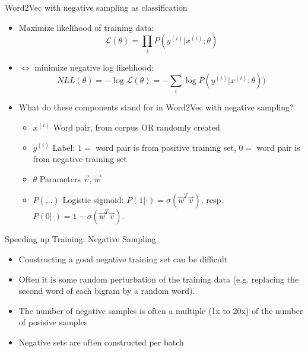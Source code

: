 \begin{vbframe}{Word2Vec with negative sampling as classification}

\vfill

\begin{itemize}
	\item Maximize likelihood of training data:
	$$\mathcal{L}(\theta) = \prod_{i} P(y^{(i)}|x^{(i)}; \theta)$$
	\item $\Leftrightarrow$ minimize negative log likelihood:
	$$NLL(\theta) = - \log \mathcal{L}(\theta) = - \sum_{i} \log P(y^{(i)}|x^{(i)}; \theta))$$
	\item \ques What do these components stand for in Word2Vec with negative sampling?
		\begin{itemize}
			\item $x^{(i)}$ Word pair, from corpus OR randomly created
			\item $y^{(i)}$ Label: $1 = $ word pair is from positive training set, $0 = $ word pair is from negative training set
			\item $\theta$ Parameters $\vec v$, $\vec w$
			\item $P(...)$ Logistic sigmoid: $P(1|\cdot) = \sigma(\vec w^T \vec v)$, resp. $P(0|\cdot) = 1-\sigma(\vec w^T \vec v)$.
		\end{itemize}
\end{itemize}

\vfill

\end{vbframe}


\begin{vbframe}{Speeding up Training: Negative Sampling}

\vfill

\begin{itemize}
	\item Constructing a good negative training set can be difficult
	\item Often it is some random perturbation of the training data (e.g. replacing the second word of each bigram by a random word).
	\item The number of negative samples is often a multiple (1x to 20x) of the number of posisive samples
	\item Negative sets are often constructed per batch
\end{itemize}

\vfill

\end{vbframe}

